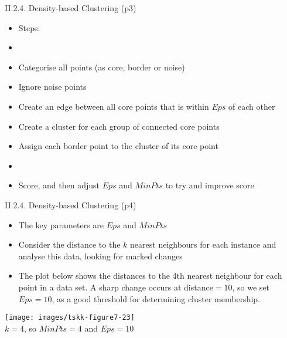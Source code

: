 \documentclass[handout]{beamer}
\begin{document}
\begin{frame}{II.2.4. Density-based Clustering (p3)}
\begin{itemize}
\item Steps:
\item[]
\item[1.] Categorise all points (as core, border or noise)
\item[2.] Ignore noise points
\item[3.] Create an edge between all core points that is within $Eps$ of each other
\item[4.] Create a cluster for each group of connected core points
\item[5.] Assign each border point to the cluster of its core point
\item[]
\item Score, and then adjust $Eps$ and $MinPts$ to try and improve score
\end{itemize}
\end{frame}
\begin{frame}{II.2.4. Density-based Clustering (p4)}
\begin{itemize}
\item The key parameters are $Eps$ and $MinPts$
\item Consider the distance to the $k$ nearest neighbours for each instance and analyse this data, looking for marked changes
\item The plot below shows the distances to the 4th nearest neighbour for each point in a data set. A sharp change occurs at distance$=10$, so we set $Eps=10$, as a good threshold for determining cluster membership.
\end{itemize}
\begin{center}
\texttt{[image: images/tskk-figure7-23]}\\
$k=4$, so $MinPts=4$ and $Eps=10$\\
\cite[Figure 7.23]{tan-et-al:2018}
\end{center}
\end{frame}
\end{document}
